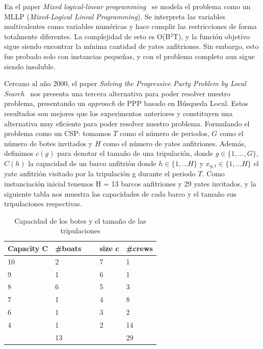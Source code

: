 \documentclass[letter, 10pt]{article}
\begin{document}
En el paper \textit{Mixed logical-linear programming}~\cite{Hooker1999395} se modela el problema como un MLLP (\textit{Mixed-Logical Lineal Programming}). Se interpreta las variables multivalentes como variables numéricas y hace cumplir las restricciones de forma totalmente diferentes. La complejidad de esto es O(B$^2$T), y la función objetivo sigue siendo encontrar la mínima cantidad de yates anfitriones.
Sin embargo, esto fue probado solo con instancias pequeñas, y con el problema completo aun sigue siendo insoluble.

Cercano al año 2000, el paper \textit{Solving the Progressive Party Problem by Local Search}~\cite{Galinier1999} nos presenta una tercera alternativa para poder resolver nuestro problema, presentando un \textit{approach} de PPP basado en Búsqueda Local. Estos resultados son mejores que los experimentos anteriores y constituyen una alternativa muy eficiente para poder resolver nuestro problema. Formulando el problema como un CSP: tomamos $T$ como el número de periodos, $G$ como el número de botes invitados y $H$ como el número de yates anfitriones. Además, definimos $c(g)$ para denotar el tamaño de una tripulación, donde  $g \in \{ 1,\ldots, G\}$, $C(h)$ la capacidad de un barco anfitrión donde $h \in \{ 1,\ldots H\}$ y $x_{g,t} \in \{ 1,\ldots H\}$ el yate anfitrión visitado por la tripulación g durante el periodo $T$. Como instanciación inicial tenemos H = 13 barcos anfitriones y 29 yates invitados, y la siguiente tabla nos muestra las capacidades de cada barco y el tamaño sus tripulaciones respectivas.

\begin{table}[ht!]
 \centering
    \begin{tabular}{|l|l|l|l|l|}
    \hline
    Capacity C & \#boats & ~ & size c & \#crews \\ \hline
    10         & 2       & ~ & 7      & 1       \\
    9          & 1       & ~ & 6      & 1       \\
    8          & 6       & ~ & 5      & 3       \\
    7          & 1       & ~ & 4      & 8       \\
    6          & 1       & ~ & 3      & 2       \\
    4          & 1       & ~ & 2      & 14      \\ \hline
    ~          & 13      & ~ & ~      & 29      \\ \hline
    \end{tabular}
        \caption{Capacidad de los botes y el tamaño de las tripulaciones}
\label{table:capacidad}
\end{table}
\end{document}

